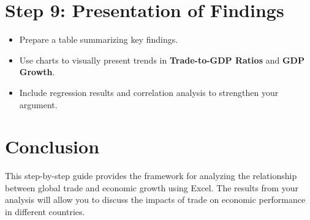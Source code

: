 \documentclass{article}
\begin{document}
\section{Step 9: Presentation of Findings}
\begin{itemize}
    \item Prepare a table summarizing key findings.
    \item Use charts to visually present trends in \textbf{Trade-to-GDP Ratios} and \textbf{GDP Growth}.
    \item Include regression results and correlation analysis to strengthen your argument.
\end{itemize}

\section{Conclusion}
This step-by-step guide provides the framework for analyzing the relationship between global trade and economic growth using Excel. The results from your analysis will allow you to discuss the impacts of trade on economic performance in different countries.
\end{document}
